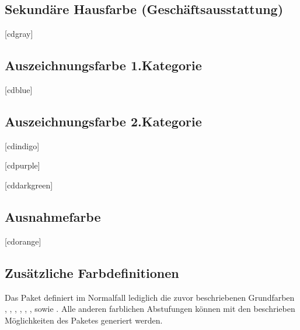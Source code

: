 \documentclass[%
  english,ngerman,%
  headings=optiontoheadandtoc,captions=tableheading,numbers=noenddot,%
  chapterpage,cdfoot,%
]{tudscrman}
\begin{document}
\subsection{Sekundäre Hausfarbe (Geschäftsausstattung)}
\begin{Declaration}{[cdgray]}
\printdeclarationlist%
\end{Declaration}

\subsection{Auszeichnungsfarbe 1.Kategorie}
\begin{Declaration}{[cdblue]}
\printdeclarationlist%
\end{Declaration}

\subsection{Auszeichnungsfarbe 2.Kategorie}
\begin{Declaration}{[cdindigo]}
\begin{Declaration}{[cdpurple]}
\begin{Declaration}{[cddarkgreen]}
\end{Declaration}
\end{Declaration}
\end{Declaration}

\subsection{Ausnahmefarbe}
\begin{Declaration}{[cdorange]}
\printdeclarationlist%
\end{Declaration}

\subsection{Zusätzliche Farbdefinitionen}
Das Paket  definiert im Normalfall lediglich die zuvor 
beschriebenen Grundfarben , , , 
, , ,  sowie 
. Alle anderen farblichen Abstufungen können mit den beschrieben 
Möglichkeiten des Paketes  generiert werden.
\end{document}
